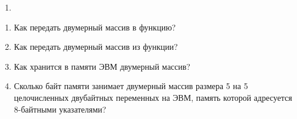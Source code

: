 
\labtask

\begin{enumerate}
	\item
\end{enumerate}

\labtask


\labworkquestions

\begin{enumerate}
	\item
		Как передать двумерный массив в функцию?
	\item
		Как передать двумерный массив из функции?
	\item
		Как хранится в памяти ЭВМ двумерный массив?
	\item
		Сколько байт памяти занимает двумерный массив размера 5 на 5 целочисленных двубайтных переменных на ЭВМ, память которой адресуется 8-байтными указателями? 
\end{enumerate}



